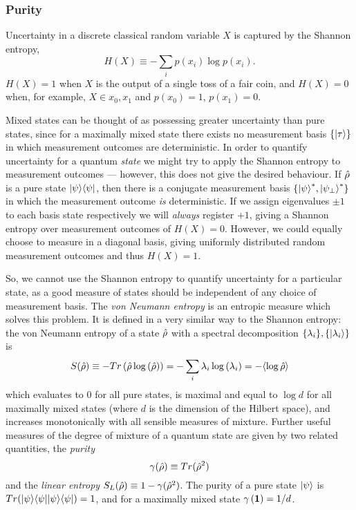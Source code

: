 \subsubsection{Purity}
Uncertainty in a discrete classical random variable $X$ is captured by the Shannon entropy, 
\begin{equation}
H(X) \equiv - \sum_i p(x_i) \log p(x_i).
\end{equation}
$H(X) = 1$ when $X$ is the output of a single toss of a fair coin, and $H(X) = 0$ when, for example, $X \in {x_0, x_1}$ and $p(x_0)=1$, $p(x_1)=0$.

Mixed states can be thought of as possessing greater uncertainty than pure states, since for a maximally mixed state there exists no measurement basis $\{ \mbox{$ | \tau \rangle $} \}$ in which measurement outcomes are deterministic.
In order to quantify uncertainty for a quantum \emph{state} we might try to apply the Shannon entropy to measurement outcomes --- however, this does not give the desired behaviour.  If $\hat{\rho}$ is a pure state $\mbox{$ | \psi \rangle $}\mbox{$ \langle \psi | $}$, then there is a conjugate measurement basis $\{\mbox{$ | \psi \rangle $}^*, \mbox{$ | \psi_\perp \rangle $}^* \}$ in which the measurement outcome \emph{is} deterministic. If we assign eigenvalues $\pm1$ to each basis state respectively we will \emph{always} register $+1$, giving a Shannon entropy over measurement outcomes of $H(X)=0$.  However, we could equally choose to measure in a diagonal basis, giving uniformly distributed random measurement outcomes and thus $H(X)=1$. 

So, we cannot use the Shannon entropy to quantify uncertainty for a particular state, as a good measure of states should be independent of any choice of measurement basis.  
The \emph{von Neumann entropy} is an entropic measure which solves this problem. It is defined in a very similar way to the Shannon entropy: the von Neumann entropy of a state $\hat{\rho}$ with a spectral decomposition $\{\lambda_i\}, \{\mbox{$ | \lambda_i \rangle $} \}$ is 
\begin{equation}
S(\hat{\rho}) \equiv -Tr\left(\hat{\rho} \log \left( \hat{\rho} \right) \right) = -\sum_{i} \lambda_i \log \left( \lambda_i \right) = -\langle \log \hat{\rho} \rangle
\end{equation}
which evaluates to 0 for all pure states, is maximal and equal to $\log d$ for all maximally mixed states (where $d$ is the dimension of the Hilbert space), and increases monotonically with all sensible measures of mixture.  
Further useful measures of the degree of mixture of a quantum state are given by two related quantities, the \emph{purity} 
\begin{equation}
\gamma(\hat{\rho}) \equiv Tr(\hat{\rho}^2)
\label{eqn:purity}
\end{equation}
and the \emph{linear entropy} $S_L(\hat{\rho}) \equiv 1-\gamma(\hat{\rho}^2)$. The purity of a pure state $\mbox{$ | \psi \rangle $}$ is $Tr(\mbox{$ | \psi \rangle $}\mbox{$ \langle \psi | $}\mbox{$ | \psi \rangle $}\mbox{$ \langle \psi | $}) = 1$, and for a maximally mixed state $\gamma \left( \mathbf{1} \right) = 1/d$.

